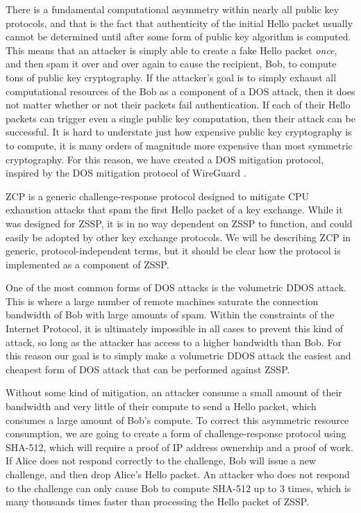 \documentclass{article}
\begin{document}
There is a fundamental computational asymmetry within nearly all public key protocols, and that is the fact that authenticity of the initial Hello packet usually cannot be determined until after some form of public key algorithm is computed. This means that an attacker is simply able to create a fake Hello packet \emph{once}, and then spam it over and over again to cause the recipient, Bob, to compute tons of public key cryptography. If the attacker's goal is to simply exhaust all computational resources of the Bob as a component of a DOS attack, then it does not matter whether or not their packets fail authentication. If each of their Hello packets can trigger even a single public key computation, then their attack can be successful. It is hard to understate just how expensive public key cryptography is to compute, it is many orders of magnitude more expensive than most symmetric cryptography. For this reason, we have created a  DOS mitigation protocol, inspired by the DOS mitigation protocol of WireGuard \cite{wireguard}.

ZCP is a generic challenge-response protocol designed to mitigate CPU exhaustion attacks that spam the first Hello packet of a key exchange. While it was designed for ZSSP, it is in no way dependent on ZSSP to function, and could easily be adopted by other key exchange protocols. We will be describing ZCP in generic, protocol-independent terms, but it should be clear how the protocol is implemented as a component of ZSSP.

One of the most common forms of DOS attacks is the volumetric DDOS attack. This is where a large number of remote machines saturate the connection bandwidth of Bob with large amounts of spam. Within the constraints of the Internet Protocol, it is ultimately impossible in all cases to prevent this kind of attack, so long as the attacker has access to a higher bandwidth than Bob. For this reason our goal is to simply make a volumetric DDOS attack the easiest and cheapest form of DOS attack that can be performed against ZSSP.

Without some kind of mitigation, an attacker consume a small amount of their bandwidth and very little of their compute to send a Hello packet, which consumes a large amount of Bob's compute. To correct this asymmetric resource consumption, we are going to create a form of challenge-response protocol using SHA-512, which will require a proof of IP address ownership and a proof of work. If Alice does not respond correctly to the challenge, Bob will issue a new challenge, and then drop Alice's Hello packet. An attacker who does not respond to the challenge can only cause Bob to compute SHA-512 up to 3 times, which is many thousands times faster than processing the Hello packet of ZSSP.
\end{document}

